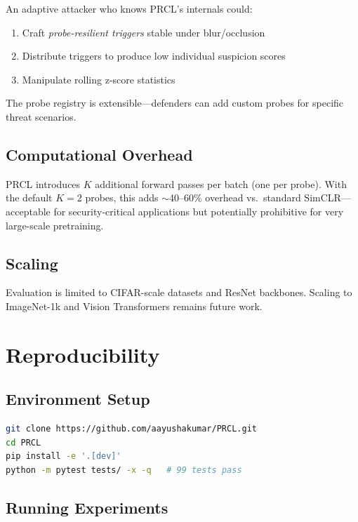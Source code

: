 \documentclass[11pt,a4paper]{article}
\begin{document}
An adaptive attacker who knows PRCL's internals could:
\begin{enumerate}[nosep]
  \item Craft \emph{probe-resilient triggers} stable under blur/occlusion
  \item Distribute triggers to produce low individual suspicion scores
  \item Manipulate rolling z-score statistics
\end{enumerate}
The probe registry is extensible---defenders can add custom probes for specific
threat scenarios.

\subsection{Computational Overhead}

PRCL introduces $K$ additional forward passes per batch (one per probe).  With
the default $K=2$ probes, this adds $\sim$40--60\% overhead vs.\ standard
SimCLR---acceptable for security-critical applications but potentially
prohibitive for very large-scale pretraining.

\subsection{Scaling}

Evaluation is limited to CIFAR-scale datasets and ResNet backbones.  Scaling to
ImageNet-1k and Vision Transformers remains future work.


\section{Reproducibility}
\label{sec:reproducibility}

\subsection{Environment Setup}

\begin{lstlisting}[language=bash]
git clone https://github.com/aayushakumar/PRCL.git
cd PRCL
pip install -e '.[dev]'
python -m pytest tests/ -x -q   # 99 tests pass
\end{lstlisting}

\subsection{Running Experiments}
\end{document}
